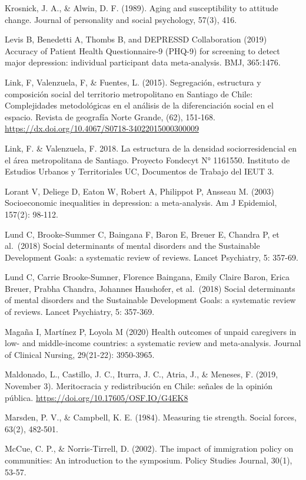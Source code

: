\documentclass[
  12pt,
]{book}
\begin{document}
Krosnick, J. A., \& Alwin, D. F. (1989). Aging and susceptibility to attitude change. Journal of personality and social psychology, 57(3), 416.

Levis B, Benedetti A, Thombs B, and DEPRESSD Collaboration (2019) Accuracy of Patient Health Questionnaire-9 (PHQ-9) for screening to detect major depression: individual participant data meta-analysis. BMJ, 365:1476.

Link, F, Valenzuela, F, \& Fuentes, L. (2015). Segregación, estructura y composición social del territorio metropolitano en Santiago de Chile: Complejidades metodológicas en el análisis de la diferenciación social en el espacio. Revista de geografía Norte Grande, (62), 151-168. \url{https://dx.doi.org/10.4067/S0718-34022015000300009}

Link, F. \& Valenzuela, F. 2018. La estructura de la densidad sociorresidencial en el área metropolitana de Santiago. Proyecto Fondecyt N° 1161550. Instituto de Estudios Urbanos y Territoriales UC, Documentos de Trabajo del IEUT 3.

Lorant V, Deliege D, Eaton W, Robert A, Philippot P, Ansseau M. (2003) Socioeconomic inequalities in depression: a meta-analysis. Am J Epidemiol, 157(2): 98-112.

Lund C, Brooke-Summer C, Baingana F, Baron E, Breuer E, Chandra P, et al.~(2018) Social determinants of mental disorders and the Sustainable Development Goals: a systematic review of reviews. Lancet Psychiatry, 5: 357-69.

Lund C, Carrie Brooke-Sumner, Florence Baingana, Emily Claire Baron, Erica Breuer, Prabha Chandra, Johannes Haushofer, et al.~(2018) Social determinants of mental disorders and the Sustainable Development Goals: a systematic review of reviews. Lancet Psychiatry, 5: 357-369.

Magaña I, Martínez P, Loyola M (2020) Health outcomes of unpaid caregivers in low- and middle-income countries: a systematic review and meta-analysis. Journal of Clinical Nursing, 29(21-22): 3950-3965.

Maldonado, L., Castillo, J. C., Iturra, J. C., Atria, J., \& Meneses, F. (2019, November 3). Meritocracia y redistribución en Chile: señales de la opinión pública. \url{https://doi.org/10.17605/OSF.IO/G4EK8}

Marsden, P. V., \& Campbell, K. E. (1984). Measuring tie strength. Social forces, 63(2), 482-501.

McCue, C. P., \& Norris‐Tirrell, D. (2002). The impact of immigration policy on communities: An introduction to the symposium. Policy Studies Journal, 30(1), 53-57.
\end{document}
